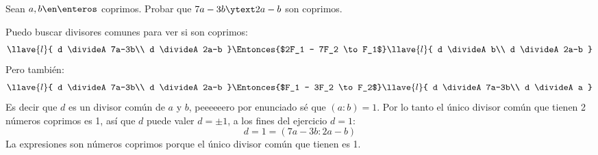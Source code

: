 \begin{enunciado}{\ejercicio}
  Sean $a,b \en \enteros$ coprimos.
  Probar que $7a - 3b \ytext 2a -b$ son coprimos.
\end{enunciado}

Puedo buscar divisores comunes para ver si son coprimos:
$$
  \llave{l}{
    d \divideA 7a-3b\\
    d \divideA 2a-b
  }
  \Entonces{$2F_1 - 7F_2 \to F_1$}
  \llave{l}{
    d \divideA b\\
    d \divideA 2a-b
  }
$$
Pero también:
$$
  \llave{l}{
    d \divideA 7a-3b\\
    d \divideA 2a-b
  }
  \Entonces{$F_1 - 3F_2 \to F_2$}
  \llave{l}{
    d \divideA 7a-3b\\
    d \divideA a
  }
$$
Es decir que $d$ es un divisor común de $a$ y $b$, peeeeeero por enunciado sé que $(a:b) = 1$.
Por lo tanto el único divisor común que tienen 2 números coprimos es 1, así que $d$ puede valer
$d = \pm 1$, a los fines del ejercicio $d = 1$:
$$
  d = 1 = (7a - 3b : 2a -b)
$$
La expresiones son números coprimos porque el único divisor común que tienen es 1.

\begin{aportes}
  \item {}
\end{aportes}

